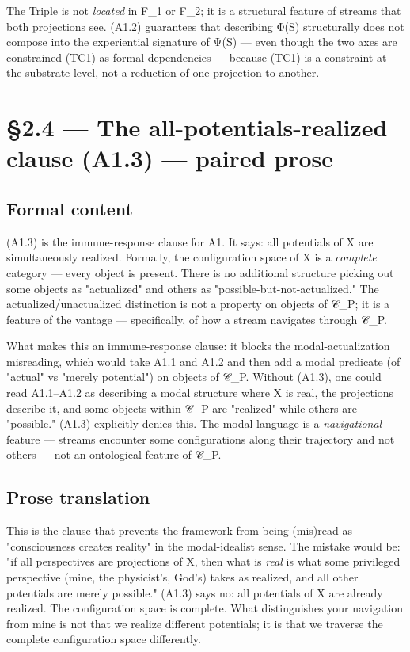 \documentclass[11pt, openany]{book}
\newcommand{\sectionbreak}{\clearpage}
\begin{document}
The Triple is not \textit{located} in F\_\allowbreak{}1 or F\_\allowbreak{}2; it is a structural feature of streams that both projections see. (A1.2) guarantees that describing Φ(S) structurally does not compose into the experiential signature of Ψ(S) --- even though the two axes are constrained (TC1) as formal dependencies --- because (TC1) is a constraint at the substrate level, not a reduction of one projection to another.

\sectionbreak

\section{§2.4 --- The all-potentials-realized clause (A1.3) --- paired prose}

\subsection{Formal content}

(A1.3) is the immune-response clause for A1. It says: all potentials of X are simultaneously realized. Formally, the configuration space of X is a \textit{complete} category --- every object is present. There is no additional structure picking out some objects as "actualized" and others as "possible-but-not-actualized." The actualized/unactualized distinction is not a property on objects of 𝒞\_\allowbreak{}P; it is a feature of the vantage --- specifically, of how a stream navigates through 𝒞\_\allowbreak{}P.

What makes this an immune-response clause: it blocks the modal-actualization misreading, which would take A1.1 and A1.2 and then add a modal predicate (of "actual" vs "merely potential") on objects of 𝒞\_\allowbreak{}P. Without (A1.3), one could read A1.1–A1.2 as describing a modal structure where X is real, the projections describe it, and some objects within 𝒞\_\allowbreak{}P are "realized" while others are "possible." (A1.3) explicitly denies this. The modal language is a \textit{navigational} feature --- streams encounter some configurations along their trajectory and not others --- not an ontological feature of 𝒞\_\allowbreak{}P.

\subsection{Prose translation}

This is the clause that prevents the framework from being (mis)read as "consciousness creates reality" in the modal-idealist sense. The mistake would be: "if all perspectives are projections of X, then what is \textit{real} is what some privileged perspective (mine, the physicist's, God's) takes as realized, and all other potentials are merely possible." (A1.3) says no: all potentials of X are already realized. The configuration space is complete. What distinguishes your navigation from mine is not that we realize different potentials; it is that we traverse the complete configuration space differently.
\end{document}
